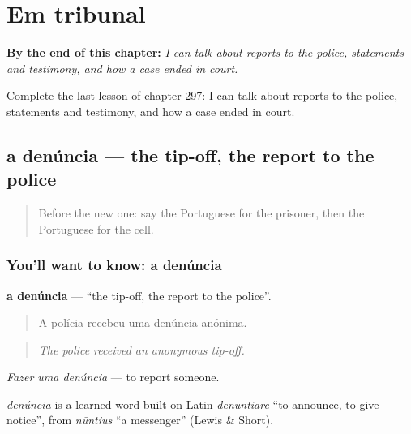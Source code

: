 
\chapter{Em tribunal}
\label{ch:pt-em-tribunal}

\begin{chapteropening}
\textbf{By the end of this chapter:} \emph{I can talk about reports to the police, statements and testimony, and how a case ended in court.}

Complete the last lesson of chapter 297: I can talk about reports to the police, statements and testimony, and how a case ended in court.
\end{chapteropening}

\section[a denúncia]{a denúncia — the tip-off, the report to the police}

\label{lesson:PT-C297-denuncia}



\begin{quote}
Before the new one: say the Portuguese for the prisoner, then the Portuguese for the cell.
\end{quote}

\subsection*{You'll want to know: a denúncia}
\textbf{a denúncia} — \textquotedblleft{}the tip-off, the report to the police\textquotedblright{}.

\begin{quote}
A polícia recebeu uma denúncia anónima.
\end{quote}

\begin{quote}
\emph{The police received an anonymous tip-off.}
\end{quote}

\emph{Fazer uma denúncia} — to report someone.

\begin{cousinweb}
\emph{denúncia} is a learned word built on Latin \emph{dēnūntiāre} \textquotedblleft{}to announce, to give notice\textquotedblright{}, from \emph{nūntius} \textquotedblleft{}a messenger\textquotedblright{} (Lewis \& Short).
\end{cousinweb}

